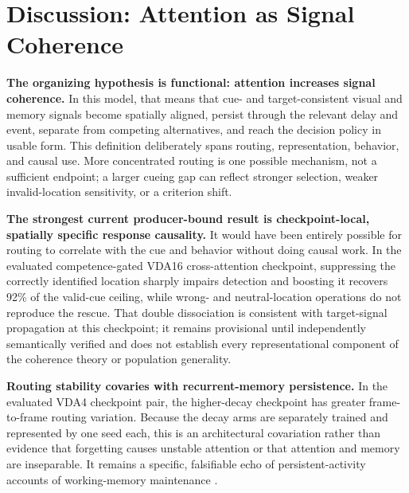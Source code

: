 \documentclass[10pt]{article}
\begin{document}
\FloatBarrier
\section{Discussion: Attention as Signal Coherence}\label{sec:discussion}
\textbf{The organizing hypothesis is functional: attention increases signal coherence.} In this model, that means that cue- and target-consistent visual and memory signals become spatially aligned, persist through the relevant delay and event, separate from competing alternatives, and reach the decision policy in usable form. This definition deliberately spans routing, representation, behavior, and causal use. More concentrated routing is one possible mechanism, not a sufficient endpoint; a larger cueing gap can reflect stronger selection, weaker invalid-location sensitivity, or a criterion shift.

\textbf{The strongest current producer-bound result is checkpoint-local, spatially specific response causality.} It would have been entirely possible for routing to correlate with the cue and behavior without doing causal work. In the evaluated competence-gated VDA16 cross-attention checkpoint, suppressing the correctly identified location sharply impairs detection and boosting it recovers 92\% of the valid-cue ceiling, while wrong- and neutral-location operations do not reproduce the rescue. That double dissociation is consistent with target-signal propagation at this checkpoint; it remains provisional until independently semantically verified and does not establish every representational component of the coherence theory or population generality.

\textbf{Routing stability covaries with recurrent-memory persistence.} In the evaluated VDA4 checkpoint pair, the higher-decay checkpoint has greater frame-to-frame routing variation. Because the decay arms are separately trained and represented by one seed each, this is an architectural covariation rather than evidence that forgetting causes unstable attention or that attention and memory are inseparable. It remains a specific, falsifiable echo of persistent-activity accounts of working-memory maintenance \cite{luck1997,awh2001}.
\end{document}

